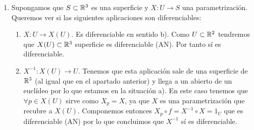 \begin{ejemplo}
\begin{enumerate}
        Una consecuencia de esto es que solo necesitaremos demostrar la diferenciabilidad en el sentido a) para un recubrimiento, en lugar de para toda parametrización.

        \item Supongamos que $S\subset \mathbb{R}^3$ es una superficie y $X:U\to S$ una parametrización. Queremos ver si las siguientes aplicaciones son diferenciables:
        \begin{enumerate}
            \item $X:U\to X(U)$. Es diferenciable en sentido b). Como $U\subset \mathbb{R}^2$ tendremos que $X(U)\subset \mathbb{R}^3$ superficie es diferenciable (AN). Por tanto sí es diferenciable.
            \item $X^{-1}:X(U)\to U$. Tenemos que esta aplicación sale de una superficie de $\mathbb{R}^3$ (al igual que en el apartado anterior) y llega a un abierto de un euclídeo por lo que estamos en la situación a). En este caso tenemos que $\forall p \in X(U)$ sirve como $X_p=X$, ya que $X$ es una parametrización que recubre a $X(U)$. Componemos entonces $X_p\circ f = X^{-1}\circ X = 1_U$ que es diferenciable (AN) por lo que concluimos que $X^{-1}$ sí es diferenciable.
        \end{enumerate}     
    \end{enumerate}
\end{ejemplo}

